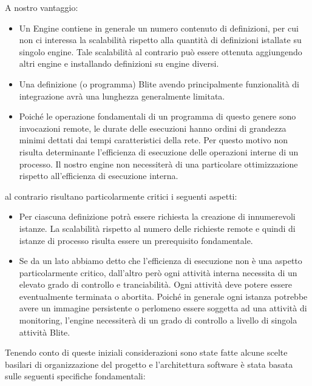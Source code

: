 A nostro vantaggio:
\begin{itemize}
  \item Un Engine contiene in generale un numero contenuto di definizioni, per
  cui non ci interessa la scalabilità rispetto alla quantità di definizioni
  istallate su singolo engine. Tale scalabilità al contrario può essere
  ottenuta aggiungendo altri engine e installando definizioni su engine diversi.
  
  \item  Una definizione (o programma) Blite avendo principalmente funzionalità
  di integrazione avrà una lunghezza generalmente limitata. 
  
  \item Poiché le operazione fondamentali di un programma di questo genere
  sono invocazioni remote, le durate delle esecuzioni hanno ordini di grandezza
  minimi dettati dai tempi caratteristici della rete. Per questo motivo non
  risulta determinante l'efficienza di esecuzione delle operazioni interne di un
  processo. Il nostro engine non necessiterà di una particolare ottimizzazione 
  rispetto all'efficienza di esecuzione interna.
\end{itemize}

al contrario risultano particolarmente critici i seguenti aspetti:
\begin{itemize}
  \item Per ciascuna definizione potrà essere richiesta la creazione di
  innumerevoli istanze. La scalabilità rispetto al numero delle
  richieste remote e quindi di istanze di processo risulta essere un
  prerequisito fondamentale.
  
  \item Se da un lato abbiamo detto che l'efficienza di esecuzione non \`e 
  una aspetto particolarmente critico, dall'altro per\`o ogni attività interna
  necessita di un elevato grado di controllo e tranciabilità. Ogni attività deve
  potere essere eventualmente terminata o abortita. Poiché in generale
  ogni istanza potrebbe avere un immagine persistente o
  perlomeno essere soggetta ad una attività di monitoring, l'engine necessiterà
  di un grado di controllo a livello di singola attività Blite.
\end{itemize}

Tenendo conto di queste iniziali considerazioni sono state fatte alcune scelte
basilari di organizzazione del progetto e l'architettura software \`e stata
basata sulle seguenti specifiche fondamentali:

